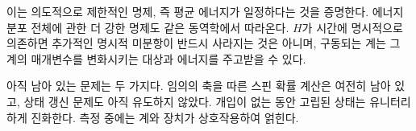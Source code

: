 이는 의도적으로 제한적인 명제, 즉 평균 에너지가 일정하다는 것을 증명한다. 에너지 분포 전체에 관한 더 강한 명제도 같은 동역학에서 따라온다. \(H\)가 시간에 명시적으로 의존하면 추가적인 명시적 미분항이 반드시 사라지는 것은 아니며, 구동되는 계는 그 계의 매개변수를 변화시키는 대상과 에너지를 주고받을 수 있다.

아직 남아 있는 문제는 두 가지다. 임의의 축을 따른 스핀 확률 계산은 여전히 남아 있고, 상태 갱신 문제도 아직 유도하지 않았다. 개입이 없는 동안 고립된 상태는 유니터리하게 진화한다. 측정 중에는 계와 장치가 상호작용하여 얽힌다.

\begin{classroomqa}
\end{classroomqa}

\begin{classroomqa}
\end{classroomqa}